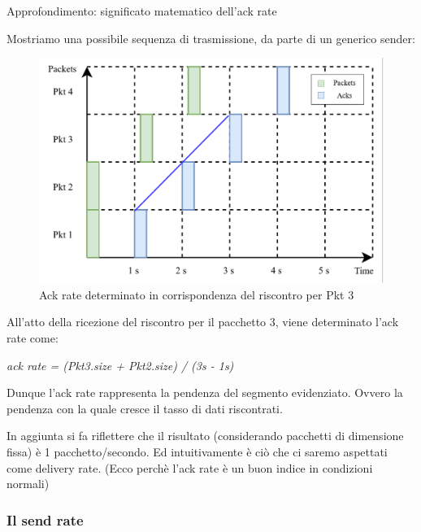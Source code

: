 \begin{approfondimento}{Approfondimento: significato matematico dell'ack rate}

Mostriamo una possibile sequenza di trasmissione, da parte di un generico sender:

\begin{figure}[H]

\center
\caption{Ack rate determinato in corrispondenza del riscontro per Pkt 3}
\includegraphics[scale=0.3]{chapters/3_bbr/img/ack_rate}

\end{figure}

All'atto della ricezione del riscontro per il pacchetto 3, viene determinato l'ack rate come:

\begin{center}

\textit{ack rate = (Pkt3.size + Pkt2.size) / (3s - 1s)}

\end{center}

Dunque l'ack rate rappresenta la pendenza del segmento evidenziato. Ovvero la pendenza con la quale cresce il tasso di dati riscontrati. \bigskip

In aggiunta si fa riflettere che il risultato (considerando pacchetti di dimensione fissa) è 1 pacchetto/secondo. Ed intuitivamente è ciò che ci saremo aspettati come delivery rate. (Ecco perchè l'ack rate è un buon indice in condizioni normali) \bigskip 

\end{approfondimento}

\subsubsection{Il send rate}

